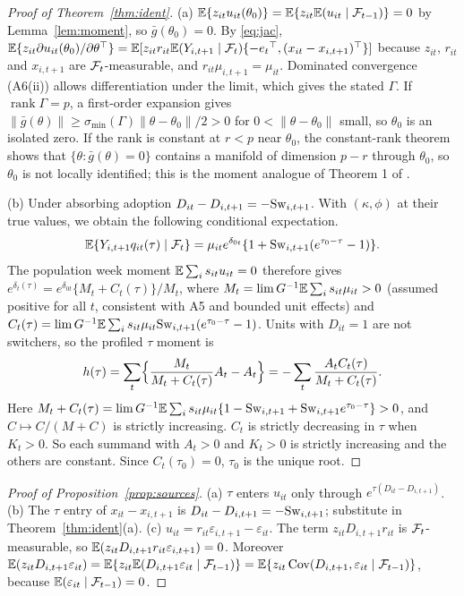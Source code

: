 \begin{proof}[Proof of Theorem~\ref{thm:ident}]
(a) $\mathbb{E}\{z_{it}u_{it}(\theta_0)\}=\mathbb{E}\{z_{it}\mathbb{E}(u_{it}\mid\mathcal{F}_{t-1})\}=0$ by Lemma~\ref{lem:moment}, so
$\bar g(\theta_0)=0$. By \eqref{eq:jac},
$\mathbb{E}\{z_{it}\partial u_{it}(\theta_0)/\partial\theta^{\top}\}=\mathbb{E}[z_{it}r_{it}\mathbb{E}(Y_{i,t+1}\mid\mathcal{F}_t)\{-e_t{}^{\top},(x_{it}-x_{i,t+1})^{\top}\}]$
because $z_{it}$, $r_{it}$ and $x_{i,t+1}$ are $\mathcal{F}_t$-measurable, and $r_{it}\mu_{i,t+1}=\mu_{it}$. Dominated
convergence (A6(ii)) allows differentiation under the limit, which gives the stated $\Gamma$. If
$\operatorname{rank}\Gamma=p$, a first-order expansion gives
$\|\bar g(\theta)\|\ge\sigma_{\min}(\Gamma)\|\theta-\theta_0\|/2>0$ for $0<\|\theta-\theta_0\|$ small, so
$\theta_0$ is an isolated zero. If the rank is constant at $r<p$ near $\theta_0$, the constant-rank
theorem shows that $\{\theta:\bar g(\theta)=0\}$ contains a manifold of dimension $p-r$ through
$\theta_0$, so $\theta_0$ is not locally identified; this is the moment analogue of Theorem 1 of
\citet{rothenberg1971identification}.

(b) Under absorbing adoption $D_{it}-D_{i,t+1}=-\mathrm{Sw}_{i,t+1}$. With $(\kappa,\phi)$ at their true values, we obtain the following conditional expectation.
\[
\mathbb{E}\{Y_{i,t+1}q_{it}(\tau)\mid\mathcal{F}_t\}=\mu_{it}e^{\delta_{0t}}\{1+\mathrm{Sw}_{i,t+1}(e^{\tau_0-\tau}-1)\}.
\]
The population week moment $\mathbb{E}\sum_is_{it}u_{it}=0$ therefore gives
$e^{\delta_t(\tau)}=e^{\delta_{0t}}\{M_t+C_t(\tau)\}/M_t$, where
$M_t=\lim G^{-1}\mathbb{E}\sum_is_{it}\mu_{it}>0$ (assumed positive for all $t$, consistent with A5 and
bounded unit effects) and
$C_t(\tau)=\lim G^{-1}\mathbb{E}\sum_is_{it}\mu_{it}\mathrm{Sw}_{i,t+1}(e^{\tau_0-\tau}-1)$. Units with
$D_{it}=1$ are not switchers, so the profiled $\tau$ moment is
\[
h(\tau)=\sum_t\Bigl\{\frac{M_t}{M_t+C_t(\tau)}A_t-A_t\Bigr\}=-\sum_t\frac{A_tC_t(\tau)}{M_t+C_t(\tau)} .
\]
Here $M_t+C_t(\tau)=\lim G^{-1}\mathbb{E}\sum_is_{it}\mu_{it}\{1-\mathrm{Sw}_{i,t+1}+\mathrm{Sw}_{i,t+1}e^{\tau_0-\tau}\}>0$, and
$C\mapsto C/(M+C)$ is strictly increasing. $C_t$ is strictly decreasing in $\tau$ when $K_t>0$.
So each summand with $A_t>0$ and $K_t>0$ is strictly increasing and the others are constant.
Since $C_t(\tau_0)=0$, $\tau_0$ is the unique root.
\end{proof}

\begin{proof}[Proof of Proposition~\ref{prop:sources}]
(a) $\tau$ enters $u_{it}$ only through $e^{\tau(D_{it}-D_{i,t+1})}$. (b) The $\tau$ entry of
$x_{it}-x_{i,t+1}$ is $D_{it}-D_{i,t+1}=-\mathrm{Sw}_{i,t+1}$; substitute in Theorem~\ref{thm:ident}(a).
(c) $u_{it}=r_{it}\varepsilon_{i,t+1}-\varepsilon_{it}$. The term $z_{it}D_{i,t+1}r_{it}$ is $\mathcal{F}_t$-measurable,
so $\mathbb{E}(z_{it}D_{i,t+1}r_{it}\varepsilon_{i,t+1})=0$. Moreover
$\mathbb{E}(z_{it}D_{i,t+1}\varepsilon_{it})=\mathbb{E}\{z_{it}\mathbb{E}(D_{i,t+1}\varepsilon_{it}\mid\mathcal{F}_{t-1})\}=\mathbb{E}\{z_{it}\operatorname{Cov}(D_{i,t+1},\varepsilon_{it}\mid\mathcal{F}_{t-1})\}$,
because $\mathbb{E}(\varepsilon_{it}\mid\mathcal{F}_{t-1})=0$.
\end{proof}

